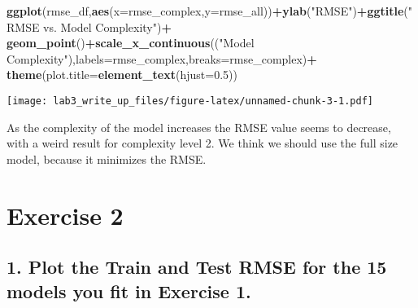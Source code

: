 \documentclass[]{article}
\newenvironment{Shaded}{\begin{snugshade}}{\end{snugshade}}
\newcommand{\DataTypeTok}[1]{\textcolor[rgb]{0.13,0.29,0.53}{#1}}
\newcommand{\FloatTok}[1]{\textcolor[rgb]{0.00,0.00,0.81}{#1}}
\newcommand{\KeywordTok}[1]{\textcolor[rgb]{0.13,0.29,0.53}{\textbf{#1}}}
\newcommand{\NormalTok}[1]{#1}
\newcommand{\OperatorTok}[1]{\textcolor[rgb]{0.81,0.36,0.00}{\textbf{#1}}}
\newcommand{\StringTok}[1]{\textcolor[rgb]{0.31,0.60,0.02}{#1}}
\begin{document}
\begin{Shaded}
\begin{Highlighting}[]
\KeywordTok{ggplot}\NormalTok{(rmse_df,}\KeywordTok{aes}\NormalTok{(}\DataTypeTok{x=}\NormalTok{rmse_complex,}\DataTypeTok{y=}\NormalTok{rmse_all))}\OperatorTok{+}\KeywordTok{ylab}\NormalTok{(}\StringTok{"RMSE"}\NormalTok{)}\OperatorTok{+}\KeywordTok{ggtitle}\NormalTok{(}\StringTok{"RMSE vs. Model Complexity"}\NormalTok{)}\OperatorTok{+}
\StringTok{  }\KeywordTok{geom_point}\NormalTok{()}\OperatorTok{+}\KeywordTok{scale_x_continuous}\NormalTok{((}\StringTok{"Model Complexity"}\NormalTok{),}\DataTypeTok{labels=}\NormalTok{rmse_complex,}\DataTypeTok{breaks=}\NormalTok{rmse_complex)}\OperatorTok{+}
\StringTok{  }\KeywordTok{theme}\NormalTok{(}\DataTypeTok{plot.title=}\KeywordTok{element_text}\NormalTok{(}\DataTypeTok{hjust=}\FloatTok{0.5}\NormalTok{))}
\end{Highlighting}
\end{Shaded}

\texttt{[image: lab3\_write\_up\_files/figure-latex/unnamed-chunk-3-1.pdf]}

As the complexity of the model increases the RMSE value seems to
decrease, with a weird result for complexity level 2. We think we should
use the full size model, because it minimizes the RMSE.

\hypertarget{exercise-2}{%
\section{Exercise 2}\label{exercise-2}}

\hypertarget{plot-the-train-and-test-rmse-for-the-15-models-you-fit-in-exercise-1.}{%
\subsection{1. Plot the Train and Test RMSE for the 15 models you fit in
Exercise
1.}\label{plot-the-train-and-test-rmse-for-the-15-models-you-fit-in-exercise-1.}}
\end{document}
